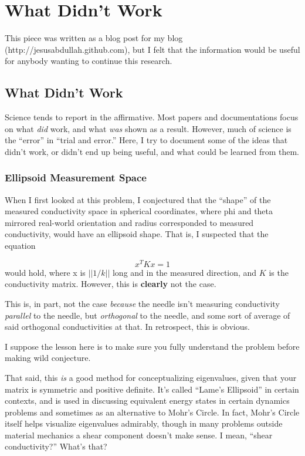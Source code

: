 \chapter{What Didn't Work}

This piece was written as a blog post for my blog
(http://jesusabdullah.github.com), but I felt that the information would be
useful for anybody wanting to continue this research.

\section{What Didn't Work}

Science tends to report in the affirmative. Most papers and
documentations focus on what \emph{did} work, and what \emph{was} shown
as a result. However, much of science is the ``error'' in ``trial and
error.'' Here, I try to document some of the ideas that didn't work, or
didn't end up being useful, and what could be learned from them.

\subsection{Ellipsoid Measurement Space}

When I first looked at this problem, I conjectured that the ``shape'' of
the measured conductivity space in spherical coordinates, where phi and
theta mirrored real-world orientation and radius corresponded to
measured conductivity, would have an ellipsoid shape. That is, I
suspected that the equation

\[
x^TKx = 1
\]
would hold, where x is \(||1/k||\) long
and in the measured direction, and \(K\) is the conductivity matrix.
However, this is \textbf{clearly} not the case.

This is, in part, not the case \emph{because} the needle isn't measuring
conductivity \emph{parallel} to the needle, but \emph{orthogonal} to the
needle, and some sort of average of said orthogonal conductivities at
that. In retrospect, this is obvious.

I suppose the lesson here is to make sure you fully understand the
problem before making wild conjecture.

That said, this \emph{is} a good method for conceptualizing eigenvalues,
given that your matrix is symmetric and positive definite. It's called
``Lame's Ellipsoid'' in certain contexts, and is used in discussing
equivalent energy states in certain dynamics problems and sometimes as
an alternative to Mohr's Circle. In fact, Mohr's Circle itself helps
visualize eigenvalues admirably, though in many problems outside
material mechanics a shear component doesn't make sense. I mean, ``shear
conductivity?'' What's that?

